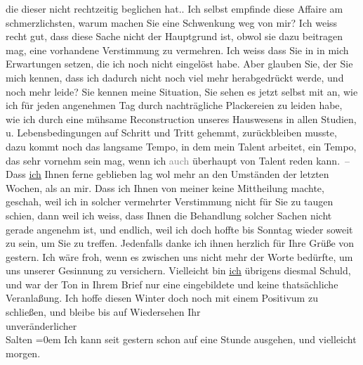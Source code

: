 \begin{ledgroupsized}[t]{13cm}
{{{               die dieser nicht rechtzeitig beglichen hat.}}}\label{K_L03132-2h}. Ich selbst {\pb}empfinde diese Affaire am
               schmerzlichsten, warum machen Sie eine Schwenkung weg von mir? Ich
               weiss recht gut, dass diese Sache nicht der Hauptgrund ist, obwol sie dazu beitragen
               mag, eine vorhandene Verstimmung zu vermehren. Ich weiss dass Sie in \label{K_L03132-4v}\label{K_L03132-4h} in mich Erwartungen setzen, die ich noch nicht eingelöst habe. Aber glauben
               Sie, der Sie mich kennen, dass ich dadurch nicht noch viel mehr herabgedrückt werde,
               und noch mehr leide? Sie kennen meine Situation, Sie sehen es jetzt selbst mit an,
               wie ich für jeden ange{\pb}nehmen Tag durch nachträgliche Plackereien zu leiden habe, wie ich durch eine
               mühsame Reconstruction unseres Hauswesens in allen Studien, u. Lebensbedingungen auf
               Schritt und Tritt gehemmt, zurückbleiben musste, dazu kommt noch das langsame Tempo,
               in dem mein Talent arbeitet, ein Tempo, das sehr
               vornehm sein mag, wenn ich \introOben{}\textcolor{gray}{auch}\introOben{} überhaupt von Talent reden kann. –\pend
           \pstart
           Dass \uline{ich} Ihnen ferne geblieben
               lag wol mehr an den Umständen der letzten Wochen, als an mir. Dass ich Ihnen von
               meiner \label{K_L03132-5v}\label{K_L03132-5h} keine Mittheilung
               machte, geschah, weil ich in solcher vermehrter {\pb}Verstimmung nicht für Sie zu
               taugen schien, dann weil ich weiss, dass Ihnen die Behandlung solcher Sachen nicht
               gerade angenehm ist, und endlich, weil ich doch hoffte bis Sonntag wieder soweit zu sein, um Sie zu treffen.\pend
           \pstart
           Jedenfalls danke ich ihnen herzlich für Ihre Grüße von gestern. Ich wäre froh, wenn es zwischen uns nicht mehr der Worte
               bedürfte, um uns unserer Gesinnung zu versichern.
               Vielleicht bin \uline{ich} übrigens diesmal Schuld, und war
               der Ton in Ihrem Brief nur eine eingebildete
               und keine thatsächliche Veranlaßung.\pend
           \pstart
           Ich hoffe diesen Winter doch noch mit einem Positivum zu schließen, und bleibe
               bis auf Wiedersehen Ihr {\\[\baselineskip]}unveränderlicher {\\[\baselineskip]}\spacefill\mbox{Salten}\pend
           \leftskip=0em{}\pstart
           \noindent{}Ich kann seit gestern schon auf eine Stunde
                  ausgehen, und \label{K_L03132-6v}\label{K_L03132-6h} vielleicht morgen.\pend
           

\end{ledgroupsized}
